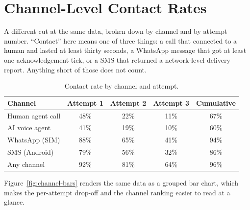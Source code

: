 \section{Channel-Level Contact Rates}
A different cut at the same data, broken down by channel and by attempt number. ``Contact'' here means one of three things: a call that connected to a human and lasted at least thirty seconds, a WhatsApp message that got at least one acknowledgement tick, or a SMS that returned a network-level delivery report. Anything short of those does not count.

\begin{table}[H]
\centering
\caption{Contact rate by channel and attempt.}
\label{tab:channel-contact}
\begin{tabularx}{\textwidth}{l c c c c}
\toprule
\textbf{Channel} & \textbf{Attempt 1} & \textbf{Attempt 2} & \textbf{Attempt 3} & \textbf{Cumulative} \\
\midrule
Human agent call & 48\% & 22\% & 11\% & 67\% \\
AI voice agent   & 41\% & 19\% & 10\% & 60\% \\
WhatsApp (SIM)   & 88\% & 65\% & 41\% & 94\% \\
SMS (Android)    & 79\% & 56\% & 32\% & 86\% \\
Any channel      & 92\% & 81\% & 64\% & 96\% \\
\bottomrule
\end{tabularx}
\end{table}

Figure~\ref{fig:channel-bars} renders the same data as a grouped bar chart, which makes the per-attempt drop-off and the channel ranking easier to read at a glance.

